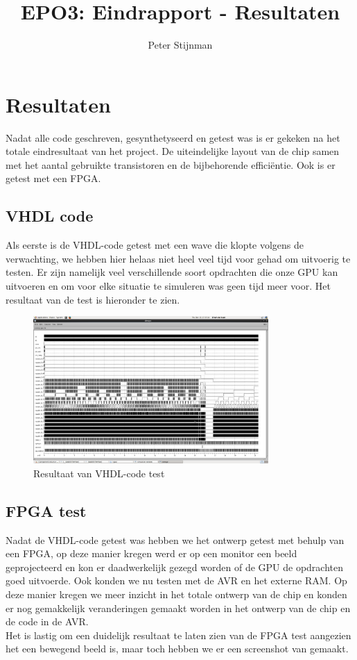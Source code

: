 \documentclass{scrartcl} %
\author{Peter Stijnman}
\title{EPO3: Eindrapport - Resultaten}
\begin{document}
\chapter{Resultaten}
\label{ch:resultaten}


Nadat alle code geschreven, gesynthetyseerd en getest was is er gekeken na het totale eindresultaat van het project. De uiteindelijke layout van de chip samen met het aantal gebruikte transistoren en de bijbehorende efficiëntie. Ook is er getest met een FPGA.

\section{VHDL code}

Als eerste is de VHDL-code getest met een wave die klopte volgens de verwachting, we hebben hier helaas niet heel veel tijd voor gehad om uitvoerig te testen. Er zijn namelijk veel verschillende soort opdrachten die onze GPU kan uitvoeren en om voor elke situatie te simuleren was geen tijd meer voor. Het resultaat van de test is hieronder te zien.

\begin{figure}[H]
	\centering
	\includegraphics[width=0.8\textwidth]{layout_sls_wave}
	\caption{Resultaat van VHDL-code test}
\end{figure}



\section{FPGA test}

Nadat de VHDL-code getest was hebben we het ontwerp getest met behulp van een FPGA, op deze manier kregen werd er op een monitor een beeld geprojecteerd en kon er daadwerkelijk gezegd worden of de GPU de opdrachten goed uitvoerde. Ook konden we nu testen met de AVR en het externe RAM. Op deze manier kregen we meer inzicht in het totale ontwerp van de chip en konden er nog gemakkelijk veranderingen gemaakt worden in het ontwerp van de chip en de code in de AVR.\\  Het is lastig om een duidelijk resultaat te laten zien van de FPGA test aangezien het een bewegend beeld is, maar toch hebben we er een screenshot van gemaakt.
\end{document}
